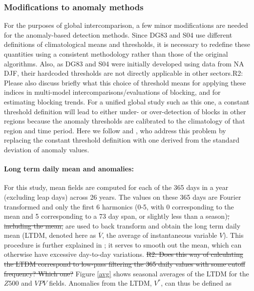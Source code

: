 \documentclass[smallextended]{svjour3}       %
\numberwithin{equation}{section}
\begin{document}
\subsubsection{Modifications to anomaly methods}\label{modanom}

For the purposes of global intercomparison, a few minor modifications are needed for the anomaly-based detection methods. Since DG83 and S04 use different definitions of climatological means and thresholds, it is necessary to redefine these quantities using a consistent methodology rather than those of the original algorithms. Also, as DG83 and S04 were initially developed using data from NA DJF, their hardcoded thresholds are not directly applicable in other sectors.{\color{teal}R2: Please also discuss briefly what this choice of threshold means for applying these indices in multi-model intercomparisons/evaluations of blocking, and for estimating blocking trends.} 
For a unified global study such as this one, a constant threshold definition will lead to either under- or over-detection of blocks in other regions because the anomaly thresholds are calibrated to the climatology of that region and time period. Here we follow \cite{barriopedro_application_2010} and \cite{dunn-sigouin_evaluation_2012}, who address this problem by replacing the constant threshold definition with one derived from the standard deviation of anomaly values. 

\paragraph{Long term daily mean and anomalies:}  For this study, mean fields are computed for each of the 365 days in a year (excluding leap days) across 26 years. The values on these 365 days are Fourier transformed and only the first 6 harmonics {\color{blue}(0-5, with 0 corresponding to the mean and 5 corresponding to a 73 day span, or slightly less than a season)\sout{, including the mean, }}are used to back transform and obtain the long term daily mean (LTDM, denoted here as $\overline{V}$, the average of instantaneous variable $V$). This procedure is further explained in \cite{grotjahn_synoptic_2017}; it serves to smooth out the mean, which can otherwise have excessive day-to-day variations. 
{\color{teal}\sout{R2: Does this way of calculating the LTDM correspond to low-pass filtering the 365 daily values with some cutoff frequency? Which one?}}
Figure \ref{avg} shows seasonal averages of the LTDM for the $Z500$ and $VPV$ fields. Anomalies from the LTDM, $V^*$, can thus be defined as 
\end{document}
